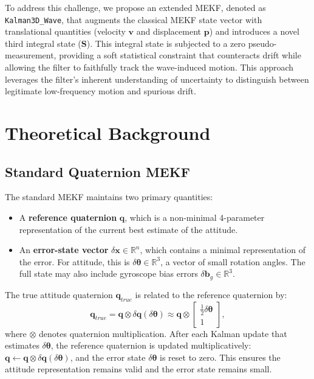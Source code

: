 \documentclass[11pt,letterpaper]{article}
\begin{document}
To address this challenge, we propose an extended MEKF, denoted as \texttt{Kalman3D\_Wave}, that augments the classical MEKF state vector with translational quantities (velocity $\bm{v}$ and displacement $\bm{p}$) and introduces a novel third integral state ($\bm{S}$). This integral state is subjected to a zero pseudo-measurement, providing a soft statistical constraint that counteracts drift while allowing the filter to faithfully track the wave-induced motion. This approach leverages the filter's inherent understanding of uncertainty to distinguish between legitimate low-frequency motion and spurious drift.

\section{Theoretical Background}
\label{sec:theory}

\subsection{Standard Quaternion MEKF}
The standard MEKF maintains two primary quantities:
\begin{itemize}
    \item A \textbf{reference quaternion} $\bm{q}$, which is a non-minimal 4-parameter representation of the current best estimate of the attitude.
    \item An \textbf{error-state vector} $\delta \bm{x} \in \mathbb{R}^{n}$, which contains a minimal representation of the error. For attitude, this is $\delta \bm{\theta} \in \mathbb{R}^3$, a vector of small rotation angles. The full state may also include gyroscope bias errors $\delta \bm{b}_g \in \mathbb{R}^3$.
\end{itemize}
The true attitude quaternion $\bm{q}_{true}$ is related to the reference quaternion by:
\begin{equation}
\bm{q}_{true} = \bm{q} \otimes \delta \bm{q}(\delta \bm{\theta}) \approx \bm{q} \otimes \begin{bmatrix} \frac{1}{2}\delta \bm{\theta} \\ 1 \end{bmatrix},
\end{equation}
where $\otimes$ denotes quaternion multiplication. After each Kalman update that estimates $\delta \bm{\theta}$, the reference quaternion is updated multiplicatively: $\bm{q} \leftarrow \bm{q} \otimes \delta \bm{q}(\delta \bm{\theta})$, and the error state $\delta \bm{\theta}$ is reset to zero. This ensures the attitude representation remains valid and the error state remains small.
\end{document}

